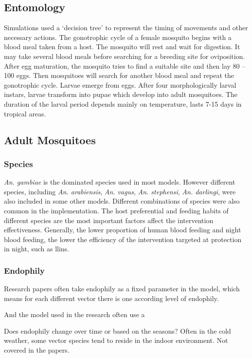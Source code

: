 \documentclass[a4paper, 12pt, twoside]{article}
\begin{document}
\subsection{Entomology}
Simulations used a ‘decision tree’ to represent the timing of movements and other necessary actions.
The gonotrophic cycle of a female mosquito begins with a blood meal taken from a host.
The mosquito will rest and wait for digestion.
It may take several blood meals before searching for a breeding site for oviposition.
After egg maturation, the mosquito tries to find a suitable site and then lay 80 – 100 eggs.
Then mosquitoes will search for another blood meal and repeat the gonotrophic cycle.
Larvae emerge from eggs.
After four morphologically larval instars, larvae transform into pupae which develop into adult mosquitoes.
The duration of the larval period depends mainly on temperature, lasts 7-15 days in tropical areas.

\subsection{Adult Mosquitoes}

\subsubsection{Species}
\textit{An. gambiae} is the dominated species used in most models.
However different species, including \textit{An. arabiensis}, \textit{An. vagus}, \textit{An. stephensi}, \textit{An. darlingi}, were also included in some other models.
Different combinations of species were also common in the implementation.
The host preferential and feeding habits of different species are the most important factors affect the intervention effectiveness.
Generally, the lower proportion of human blood feeding and night blood feeding, the lower the efficiency of the intervention targeted at protection in night, such as \gls{llins}.

\subsubsection{Endophily}
Research papers often take endophily as a fixed parameter in the model, which means for each different vector there is one according level of endophily.

And the model used in the research often use a

Does endophily change over time or based on the seasons? Often in the cold weather, some vector species tend to reside in the indoor environment. Not covered in the papers.
\end{document}
